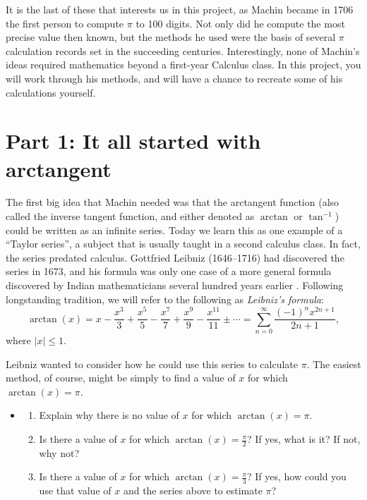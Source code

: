 \documentclass[11pt]{article}
\newcounter{tasknumb}
\newcommand{\tasknumb}{\stepcounter{tasknumb}\textmd{\textbf{$\fbox{$\fbox{Task \thetasknumb}$}$}}}
\newenvironment{task}%
 {\begin{itemize}
 \item[\tasknumb]  }
{
    \end{itemize}    }%
\begin{document}
It is the last of these that interests us in this project, as Machin became in 1706 the first person to compute $\pi$ to 100 digits. Not only did he compute the most precise value then known, but the methods he used were the basis of several $\pi$ calculation records set in the succeeding centuries.  Interestingly, none of Machin's ideas required mathematics beyond a first-year Calculus class.  In this project, you will work through his methods, and will have a chance to recreate some of his calculations yourself.


\section*{Part 1: It all started with arctangent}

The first big idea that Machin needed was that the arctangent function (also called the inverse tangent function, and either denoted as $\arctan$ or $\tan^{-1}$) could be written as an infinite series.  Today we learn this as one example of a ``Taylor series'', a subject that is usually taught in a second calculus class. In fact, the series predated calculus. Gottfried Leibniz (1646--1716) had discovered the series in 1673, and his formula was only one case of a more general formula discovered by Indian mathematicians several hundred years earlier \cite{R1990}. Following longstanding tradition, we will refer to the following as \emph{Leibniz's formula}:
$$
\arctan(x) = x - \frac{x^3}{3} + \frac{x^5}{5} -  \frac{x^7}{7} + \frac{x^9}{9} - \frac{x^{11}}{11} \pm \cdots = \sum_{n=0}^\infty \frac{(-1)^n x^{2n+1}}{2n+1},
$$
where $|x| \le 1$.

Leibniz wanted to consider how he could use this series to calculate $\pi$.  The easiest method, of course, might be simply to find a value of $x$ for which $\arctan(x) = \pi$.

\begin{task}
\begin{enumerate}
\item[a.] Explain why there is no value of $x$ for which $\arctan(x) = \pi$.
\item[b.] Is there a value of $x$ for which $\arctan(x) = \frac{\pi}{2}$?  If yes, what is it?  If not, why not?
\item[c.] Is there a value of $x$ for which $\arctan(x) = \frac{\pi}{3}$? If yes, how could you use that value of $x$ and the series above to estimate $\pi$?
\end{enumerate}
\end{task}
\end{document}
